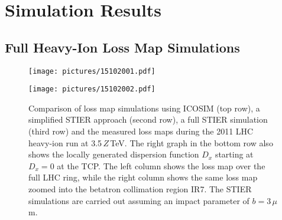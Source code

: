 \section{Simulation Results} \label{chap:STIERresults}
\subsection{Full Heavy-Ion Loss Map Simulations} \label{chap:STIER:full}

\begin{figure*}[htbp]
\begin{minipage}[t]{0.495\textwidth}
\texttt{[image: pictures/15102001.pdf]}
\end{minipage}
\begin{minipage}[t]{0.495\textwidth}
\texttt{[image: pictures/15102002.pdf]}
\end{minipage}
\caption{Comparison of loss map simulations using ICOSIM (top row), a simplified STIER approach (second row), a full STIER simulation (third row) and the measured loss maps during the 2011 LHC heavy-ion run at 3.5\,$Z\,$TeV. The right graph in the bottom row also shows the locally generated dispersion function $D_x$ starting at $D_x=0$ at the TCP. The left column shows the loss map over the full LHC ring, while the right column shows the same loss map zoomed into the betatron collimation region IR7. The STIER simulations are carried out assuming an impact parameter of $b=3\,\mu$m.}
\label{fig:comparison_lossmaps}
\end{figure*}

